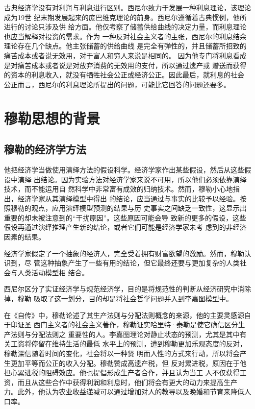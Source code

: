 古典经济学没有对利润与利息进行区别。西尼尔致力于发展一种利息理论，该理论成为19世
纪末期发展起来的庞巴维克理论的前身。西尼尔遵循着古典惯例，他所进行的讨论只涉及供
给方面。他仅考察了储蓄供给曲线的决定力量，而利息理论也应当解释对投资的需求。作为
一种反对社会主义者的主张，西尼尔的利息结余理论存在几个缺点。他主张储蓄的供给曲线
是完全有弹性的，并且储蓄所招致的痛苦成本或者说无效用，对于富人和穷人来说是相同的。
因为他专门将利息看成是对痛苦成本或者说是对放弃消费的无效用的支付，所以通过遗产或
赠送而获得的资本的利息收入，就没有牺牲社会公正或经济公正。因此最后，就利息的社会
公正而言，西尼尔的利息理论所提出的问题，可能比它回答的问题还要多。

\section{穆勒思想的背景}

\subsection{穆勒的经济学方法}

他把经济学当做使用演绎方法的假设科学。经济学家作出某些假设，然后从这些假设中演绎
出结论。因为实验方法对经济学家来说不可用，所以他们必须依靠演绎技术，而不能运用自
然科学中非常富有成效的归纳技术。然而，穆勒小心地指出，经济学家从其演绎模型中得出
的结论，应当通过与事实的比较予以经验。按照穆勒的观点，应用演绎模型预测的结果与历
史事实之间缺乏一致性，这显示出重要的却未被注意到的“干扰原因”。这些原因可能会导
致新的更多的假设，这些假设再通过演绎推理产生新的结论，或者它们可能是经济学家未考
虑到的非经济因素的结果。

经济学家假定了一个抽象的经济人，完全受着拥有财富欲望的激励。然而，穆勒认识到，尽
管这种抽象产生了一些有用的结论，但它最终还要与更加复杂的人类社会与人类活动模型相
结合。

西尼尔区分了实证经济学与规范经济学，目的是将规范性的判断从经济研究中消除掉，穆勒
吸取了这一划分，目的却是将社会哲学问题并入到李嘉图模型中。

在《自传》中，穆勒论述了其生产法则与分配法则概念的来源，他的主要灵感源自于印证圣
西门主义者的社会主义著作，穆勒证实哈里特·泰勒是使它确信区分生产法则与分配法则之
重要性的人。李嘉图理论对静止状态的预测，尤其是其中有关工资将停留在维持生活的最低
水平上的预测，遭到穆勒更加乐观态度的反对，穆勒深信随着时间的变化，社会将以一种贤
明而人性的方式来行动，所以将会产生更加平等而公正的收入分配。穆勒赞成高遗产税，但
反对累进税，原因在于他担心累进税的阻碍效应。他也提倡形成生产者合作，并且认为当工
人不仅获得工资，而且从这些合作中获得利润和利息时，他们将会有更大的动力来提高生产
力。此外，他认为农业收益递减可以通过增加对人的教导以及晚婚和节育来降低人口率。

